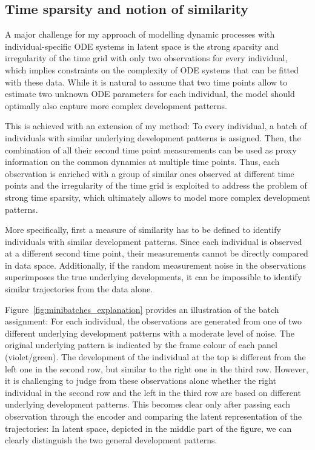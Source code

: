 \subsection{Time sparsity and notion of similarity}\label{sec:methods-batches-generalintro}

A major challenge for my approach of modelling dynamic processes with individual-specific ODE systems in latent space is the strong sparsity and irregularity of the time grid with only two observations for every individual, which implies constraints on the complexity of ODE systems that can be fitted with these data. While it is natural to assume that two time points allow to estimate two unknown ODE parameters for each individual, the model should optimally also capture more complex development patterns.

This is achieved with an extension of my method: To every individual, a batch of individuals with similar underlying development patterns is assigned. Then, the combination of all their second time point measurements can be used as proxy information on the common dynamics at multiple time points. Thus, each observation is enriched with a group of similar ones observed at different time points and the irregularity of the time grid is exploited to address the problem of strong time sparsity, which ultimately allows to model more complex development patterns. 

More specifically, first a measure of similarity has to be defined to identify individuals with similar development patterns. Since each individual is observed at a different second time point, their measurements cannot be directly compared in data space. Additionally, if the random measurement noise in the observations superimposes the true underlying developments, it can be impossible to identify similar trajectories from the data alone.

Figure~\ref{fig:minibatches_explanation} provides an illustration of the batch assignment: For each individual, the observations are generated from one of two different underlying development patterns with a moderate level of noise. The original underlying pattern is indicated by the frame colour of each panel (violet/green). The development of the individual at the top is different from the left one in the second row, but similar to the right one in the third row.
However, it is challenging to judge from these observations alone whether the right individual in the second row and the left in the third row are based on different underlying development patterns. This becomes clear only after passing each observation through the encoder and comparing the latent representation of the trajectories: In latent space, depicted in the middle part of the figure, we can clearly distinguish the two general development patterns. 

